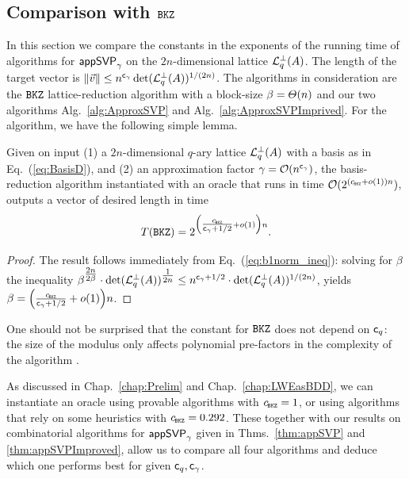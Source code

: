 \subsection{Comparison with $\texttt{BKZ}$} \label{subsec:ComparisonWithBKZ}

In this section we compare the constants in the exponents of the running time of algorithms for $\textsf{appSVP}_{\gamma}$ on the $2n$-dimensional lattice $\mathcal{L}_q^{\perp}(A)$. The length of the target vector is $\|\vvec \| \leq n^{\cg} \det(\qLATTp(\AMat))^{1/(2n)}$. The algorithms in consideration are the $\texttt{BKZ}$ lattice-reduction algorithm with a block-size $\beta = \varTheta(n)$ and our two algorithms Alg.~\ref{alg:ApproxSVP} and Alg.~\ref{alg:ApproxSVPImprived}. For the \BKZ algorithm, we have the following simple lemma.

\begin{lemma} 
	Given on input (1) a $2n$-dimensional $q$-ary lattice $\mathcal{L}_q^{\perp}(A)$ with a basis as in Eq.~(\ref{eq:BasisD}), and (2) an approximation factor $\gamma = \mathcal{O}(n^{\mathsf{c}_{\gamma}})$, the \BKZ basis-reduction algorithm instantiated with an \SVP oracle that runs in time $\bigO(2^{(\cBKZ + \smallo(1))n})$, outputs a vector of desired length in time
	\[
		T(\BKZ) = 2^{\Big( \tfrac{\cBKZ }{\cg+1/2} + \smallo(1) \Big) n}.
	\]
\end{lemma}
\begin{proof}
	The result follows immediately from Eq.~(\ref{eq:b1norm_ineq}): solving for $\beta$ the inequality $\beta^{\tfrac{2n}{2\beta}} \cdot \det (\mathcal{L}_q^{\perp}(A))^{\tfrac{1}{2n}} \leq n^{\mathsf{c}_{\gamma}+1/2} \cdot \det (\mathcal{L}_q^{\perp}(A))^{1/(2n)}$, yields $\beta = \Big( \frac{\cBKZ}{\cg+1/2} + \smallo(1) \Big)n$.
\end{proof}

One should not be surprised that the constant for $\texttt{BKZ}$ does not depend on $\mathsf{c}_q$: the size of the modulus only affects polynomial pre-factors in the complexity of the algorithm \cite{C:HanPujSte11}.

As discussed in Chap.~\ref{chap:Prelim} and Chap.~\ref{chap:LWEasBDD}, we can instantiate an \SVP oracle using provable algorithms with $\cBKZ = 1$, or using algorithms that rely on some heuristics with $\cBKZ = 0.292$. These together with our results on combinatorial algorithms for $\textsf{appSVP}_{\gamma}$ given in Thms.~\ref{thm:appSVP} and \ref{thm:appSVPImproved}, allow us to compare all four algorithms and deduce which one performs best for given $\mathsf{c}_q, \mathsf{c}_{\gamma}$. 

%
%


